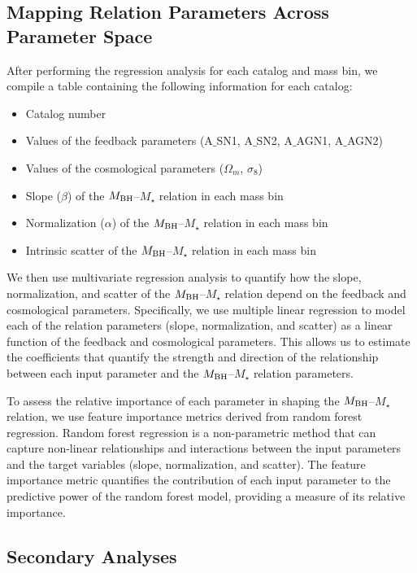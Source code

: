 \documentclass[twocolumn]{aastex631}
\begin{document}
\subsection{Mapping Relation Parameters Across Parameter Space}

After performing the regression analysis for each catalog and mass bin, we compile a table containing the following information for each catalog:

\begin{itemize}
    \item Catalog number
    \item Values of the feedback parameters (A\ensuremath{\_}{SN1}, A\ensuremath{\_}{SN2}, A\ensuremath{\_}{AGN1}, A\ensuremath{\_}{AGN2})
    \item Values of the cosmological parameters ($\Omega_m$, $\sigma_8$)
    \item Slope ($\beta$) of the $M_{\rm BH}$--$M_{\star}$ relation in each mass bin
    \item Normalization ($\alpha$) of the $M_{\rm BH}$--$M_{\star}$ relation in each mass bin
    \item Intrinsic scatter of the $M_{\rm BH}$--$M_{\star}$ relation in each mass bin
\end{itemize}

We then use multivariate regression analysis to quantify how the slope, normalization, and scatter of the $M_{\rm BH}$--$M_{\star}$ relation depend on the feedback and cosmological parameters. Specifically, we use multiple linear regression to model each of the relation parameters (slope, normalization, and scatter) as a linear function of the feedback and cosmological parameters. This allows us to estimate the coefficients that quantify the strength and direction of the relationship between each input parameter and the $M_{\rm BH}$--$M_{\star}$ relation parameters.

To assess the relative importance of each parameter in shaping the $M_{\rm BH}$--$M_{\star}$ relation, we use feature importance metrics derived from random forest regression. Random forest regression is a non-parametric method that can capture non-linear relationships and interactions between the input parameters and the target variables (slope, normalization, and scatter). The feature importance metric quantifies the contribution of each input parameter to the predictive power of the random forest model, providing a measure of its relative importance.

\subsection{Secondary Analyses}
\end{document}
